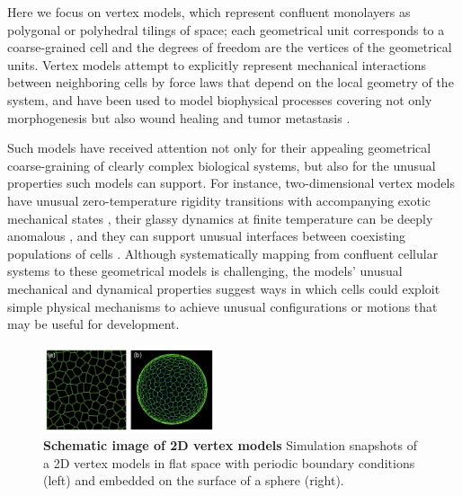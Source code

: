 \documentclass[aps,pre,reprint,superscriptaddress,nofootinbib]{revtex4-2}
\begin{document}
Here we focus on vertex models, which represent confluent monolayers as polygonal or polyhedral tilings of space; each geometrical unit corresponds to a coarse-grained cell \cite{Honda1978} and the degrees of freedom are the vertices of the geometrical units. Vertex models attempt to explicitly represent mechanical interactions between neighboring cells by force laws that depend on the local geometry of the system, and have been used to model biophysical processes covering not only morphogenesis but also wound healing and tumor metastasis  \cite{Honda2001, Bi2014,Hufnagel2006, Farhadifar2007, Friedl2009, Brugues2014, Etournay2015,spahn2013vertex}.

Such models have received attention not only for their appealing geometrical coarse-graining of clearly complex biological systems, but also for the unusual properties such models can support. For instance, two-dimensional vertex models have unusual zero-temperature rigidity transitions \cite{staple2010mechanics, Bi2015,sussman2018no,yan2019multicellular} with accompanying exotic mechanical states \cite{moshe2018geometric,noll2017active}, their glassy dynamics at finite temperature can be deeply anomalous \cite{Sussman2018epl}, and they can support unusual interfaces between coexisting populations of cells \cite{sussman2018soft}. Although systematically mapping from confluent cellular systems to these geometrical models is challenging, the models' unusual mechanical and dynamical properties suggest ways in which cells could exploit simple physical mechanisms to achieve unusual configurations or motions that may be useful for development.

\begin{figure}[b]
\centerline{
\includegraphics[width=0.45\textwidth]{schematic.png}
}
\caption{\label{fig:schematic}
{\bf{Schematic image of 2D vertex models}} 
Simulation snapshots of a 2D vertex models in flat space with periodic boundary conditions (left) and embedded on the surface of a sphere (right).}
\end{figure}
\end{document}
